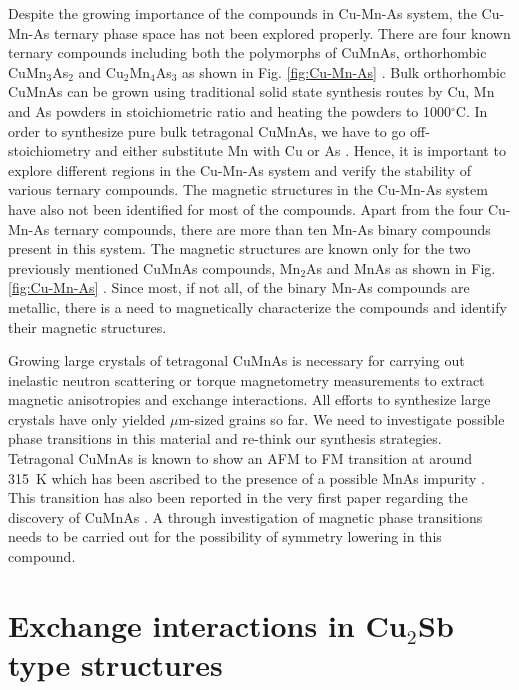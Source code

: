 \documentclass[letterpaper,10pt,doublespacing,edeposit]{uiucthesis2020}
\begin{document}
\begin{mainmatter}
Despite the growing importance of the compounds in Cu-Mn-As system, the Cu-Mn-As ternary phase space has not been explored properly. There are four known ternary compounds including both the polymorphs of CuMnAs, orthorhombic CuMn$_3$As$_2$ and Cu$_2$Mn$_4$As$_3$ as shown in Fig. \ref{fig:Cu-Mn-As} \cite{Nateprov2011,MacA2012,Wadley2013,Uhlirova2015}. Bulk orthorhombic CuMnAs can be grown using traditional solid state synthesis routes by Cu, Mn and As powders in stoichiometric ratio and heating the powders to 1000$^\circ$C. In order to synthesize pure bulk tetragonal CuMnAs, we have to go off-stoichiometry and either substitute Mn with Cu or As \cite{Uhlirova2015}. Hence, it is important to explore different regions in the Cu-Mn-As system and verify the stability of various ternary compounds. The magnetic structures in the Cu-Mn-As system have also not been identified for most of the compounds. Apart from the four Cu-Mn-As ternary compounds, there are more than ten Mn-As binary compounds present in this system. The magnetic structures are known only for the two previously mentioned CuMnAs compounds, Mn$_2$As and MnAs as shown in Fig. \ref{fig:Cu-Mn-As} \cite{MacA2012,Wadley2013,Hills2015,Wadley2015,Austin1962,Bacon1955}. Since most, if not all, of the binary Mn-As compounds are metallic, there is a need to magnetically characterize the compounds and identify their magnetic structures.

Growing large crystals of tetragonal CuMnAs is necessary for carrying out inelastic neutron scattering or torque magnetometry measurements to extract magnetic anisotropies and exchange interactions. All efforts to synthesize large crystals have only yielded $\mu$m-sized grains so far\cite{Uhlirova2019,Volny2020}. We need to investigate possible phase transitions in this material and re-think our synthesis strategies. Tetragonal CuMnAs is known to show an AFM to FM transition at around 315~K which has been ascribed to the presence of a possible MnAs impurity \cite{Uhlirova2019}. This transition has also been reported in the very first paper regarding the discovery of CuMnAs \cite{Nateprov2011}. A through investigation of magnetic phase transitions needs to be carried out for the possibility of symmetry lowering in this compound.

\section{Exchange interactions in Cu$_2$Sb type structures}


\end{mainmatter}
\end{document}
